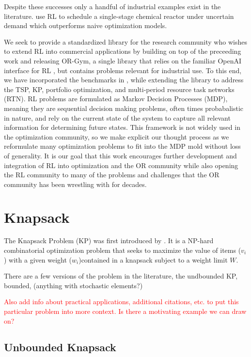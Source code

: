 \documentclass[12pt]{article}
\begin{document}
Despite these successes only a handful of industrial examples exist in the literature. 
\citet{Hubbs2020} use RL to schedule a single-stage chemical reactor under uncertain demand which outperforms naive optimization models. 

We seek to provide a standardized library for the research community who wishes to extend RL into commercial applications by building on top of the preceeding work and releasing OR-Gym, a single library that relies on the familiar OpenAI interface for RL \citep{Brockman2016}, but contains problems relevant for industrial use.
To this end, we have incorporated the benchmarks in \citet{Balaji2019}, while extending the library to address the TSP, KP, portfolio optimization, and multi-period resource task networks (RTN). 
RL problems are formulated as Markov Decision Processes (MDP), meaning they are sequential decision making problems, often times probabalistic in nature, and rely on the current state of the system to capture all relevant information for determining future states. %
This framework is not widely used in the optimization community, so we make explicit our thought process as we reformulate many optimization problems to fit into the MDP mold without loss of generality.
It is our goal that this work encourages further development and integration of RL into optimization and the OR community while also opening the RL community to many of the problems and challenges that the OR community has been wrestling with for decades.

\section{Knapsack}

The Knapsack Problem (KP) was first introduced by \citet{Mathews1896}. 
It is a NP-hard combinatorial optimization problem that seeks to maximize the value of items ($v_i$) with a given weight ($w_i$)contained in a knapsack subject to a weight limit $W$. 

There are a few versions of the problem in the literature, the undbounded KP, bounded, (anything with stochastic elements?)

\textcolor{red}{Also add info about practical applications, additional citations, etc. to put this particular problem into more context. Is there a motivating example we can draw on?}

\subsection{Unbounded Knapsack}
\end{document}
